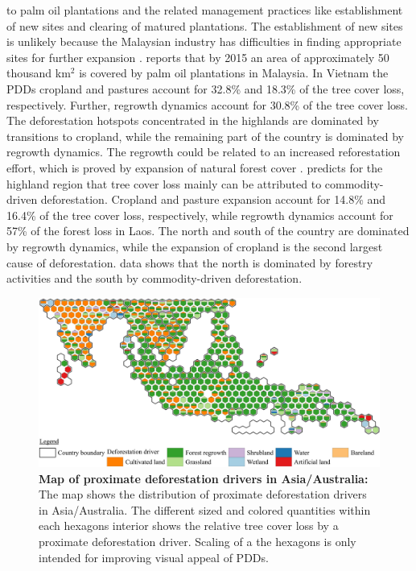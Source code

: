 to palm oil plantations and the related management practices like establishment of new sites and clearing of matured plantations. The establishment of new sites is unlikely because the Malaysian industry has difficulties in finding appropriate sites for further expansion \citep{Corley2016}. \citet{Corley2016} reports that by 2015 an area of approximately 50 thousand km$^2$ is covered by palm oil plantations in Malaysia. In Vietnam the \acp{PDD} cropland and pastures account for 32.8\% and 18.3\% of the tree cover loss, respectively. Further, regrowth dynamics account for 30.8\% of the tree cover loss. The deforestation hotspots concentrated in the highlands are dominated by transitions to cropland, while the remaining part of the country is dominated by regrowth dynamics. The regrowth could be related to an increased reforestation effort, which is proved by expansion of natural forest cover \citep{Chazdon2008}. \citet{Curtis2018} predicts for the highland region that tree cover loss mainly can be attributed to commodity-driven deforestation. Cropland and pasture expansion account for 14.8\% and 16.4\% of the tree cover loss, respectively, while regrowth dynamics account for 57\% of the forest loss in Laos. The north and south of the country are dominated by regrowth dynamics, while the expansion of cropland is the second largest cause of deforestation. \citet{Curtis2018} data shows that the north is dominated by forestry activities and the south by commodity-driven deforestation.
			\begin{figure}[ht]
				\centering
				\includegraphics[scale=1]{img/asia_driver_frameless}
				\caption[Map of proximate deforestation drivers in Asia/Australia]{\textbf{Map of proximate deforestation drivers in Asia/Australia:} The map shows the distribution of proximate deforestation drivers in Asia/Australia. The different sized and colored quantities within each hexagons interior shows the relative tree cover loss by a proximate deforestation driver. Scaling of a the hexagons is only intended for improving visual appeal of \acp{PDD}.}
				\label{fig:asia_driver}
			\end{figure}

